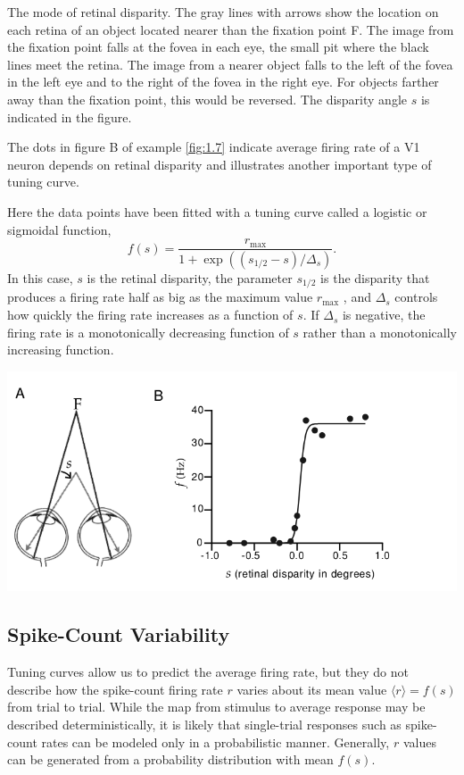 \begin{exm}
  \label{fig:1.7}
  The mode of retinal disparity. The gray lines with arrows show the
location on each retina of an object located nearer than the fixation point F. The
image from the fixation point falls at the fovea in each eye, the small pit where
the black lines meet the retina. The image from a nearer object falls to the left of
the fovea in the left eye and to the right of the fovea in the right eye. For objects
farther away than the fixation point, this would be reversed. The disparity angle $s$
is indicated in the figure.

The dots in figure B of example \ref{fig:1.7} indicate average firing rate of a V1 neuron depends on
retinal disparity and illustrates another important type of tuning curve.

Here the data points have been fitted with a tuning curve called
a logistic or sigmoidal function,
\begin{equation}
  \label{equ:1.17}
  f(s)=\frac{r_{\text{max}}}{1+\exp\left(\left(s_{1/2}-s\right)/\Delta_s\right)}.
\end{equation}
In this case, $s$ is the retinal disparity, the parameter $s_{1/2}$ is the disparity
that produces a firing rate half as big as the maximum value $r_{\text{max}}$ , and $\Delta_s$
controls how quickly the firing rate increases as a function of $s$. If $\Delta_s$ is
negative, the firing rate is a monotonically decreasing function of $s$ rather
than a monotonically increasing function.
\begin{center}
  \includegraphics[scale=0.39]{./png/fig_1_7.png}
\end{center}
\end{exm}

\subsection{Spike-Count Variability}
\begin{rem}
  Tuning curves allow us to predict the average firing rate, but they do not
describe how the spike-count firing rate $r$ varies about its mean value $\langle r\rangle=f(s) $ 
from trial to trial. While the map from stimulus to average
response may be described deterministically, it is likely that single-trial
responses such as spike-count rates can be modeled only in a probabilistic manner.
Generally, $r$ values can be generated from a probability
distribution with mean $f(s)$.
\end{rem}

